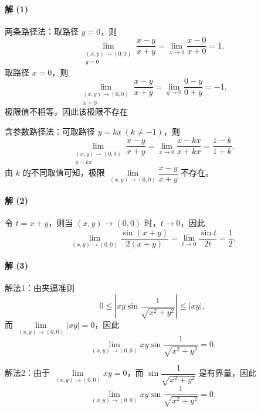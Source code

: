 \begin{solution}
 \paragraph*{解 (1)}
两条路径法：取路径 $y=0$，则
\[
\lim_{\substack{(x,y)\to(0,0) \\ y=0}} \frac{x-y}{x+y}
= \lim_{x\to0} \frac{x-0}{x+0} = 1.
\]
 取路径 $x=0$，则
\[
\lim_{\substack{(x,y)\to(0,0) \\ x=0}} \frac{x-y}{x+y}
= \lim_{y\to0} \frac{0-y}{0+y} = -1.
\]
 极限值不相等，因此该极限不存在

含参数路径法：可取路径 $y=kx\ (k\neq -1)$，则
\[
\lim_{\substack{(x,y)\to(0,0) \\ y=kx}} \frac{x-y}{x+y}
= \lim_{x\to0} \frac{x-kx}{x+kx}
= \frac{1-k}{1+k}.
\]
由 $k$ 的不同取值可知，极限 $\lim\limits_{(x,y)\to(0,0)} \dfrac{x-y}{x+y}$ 不存在。
\paragraph*{解 (2)}
令 $t = x+y$，则当 $(x,y)\to(0,0)$ 时，$t\to0$，因此
\[
\lim_{(x,y)\to(0,0)} \frac{\sin(x+y)}{2(x+y)}
= \lim_{t\to0} \frac{\sin t}{2t} = \frac{1}{2}.
\]

\paragraph*{解 (3)}
解法1：由夹逼准则
\[
0 \le \left| xy\sin\frac{1}{\sqrt{x^2+y^2}} \right| \le |xy|,
\]
而 $\lim\limits_{(x,y)\to(0,0)} |xy| = 0$，因此
\[
\lim_{(x,y)\to(0,0)} xy\sin\frac{1}{\sqrt{x^2+y^2}} = 0.
\]

解法2：由于 $\lim\limits_{(x,y)\to(0,0)} xy = 0$，而 $\sin\dfrac{1}{\sqrt{x^2+y^2}}$ 是有界量，因此
\[
\lim_{(x,y)\to(0,0)} xy\sin\frac{1}{\sqrt{x^2+y^2}} = 0.
\]
\end{solution}
